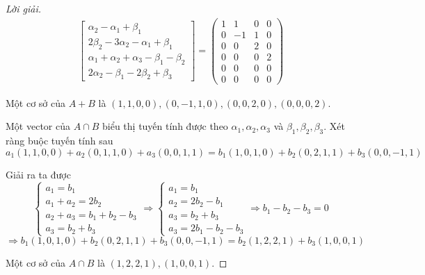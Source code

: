 \documentclass[class=linear-algebra,crop=false]{standalone}
\begin{document}
\begin{proof}[Lời giải]
\begin{align*}
\begin{bmatrix}
            \alpha_{2} - \alpha_{1} + \beta_{1}                          \\
            2\beta_{2} - 3\alpha_{2} - \alpha_{1} + \beta_{1}            \\
            \alpha_{1} + \alpha_{2} + \alpha_{3} - \beta_{1} - \beta_{2} \\
            2\alpha_{2} - \beta_{1} - 2\beta_{2} + \beta_{3}
        \end{bmatrix}=
        \begin{pmatrix}
            1 & 1  & 0 & 0 \\
            0 & -1 & 1 & 0 \\
            0 & 0  & 2 & 0 \\
            0 & 0  & 0 & 2 \\
            0 & 0  & 0 & 0 \\
            0 & 0  & 0 & 0
        \end{pmatrix}
    \end{align*}
    \par Một cơ sở của $A + B$ là $(1,1,0,0), (0,-1,1,0), (0,0,2,0), (0,0,0,2)$.
    \par Một vector của $A\cap B$ biểu thị tuyến tính được theo $\alpha_{1}, \alpha_{2}, \alpha_{3}$ và $\beta_{1}, \beta_{2}, \beta_{3}$. Xét ràng buộc tuyến tính sau
    \[ a_{1}(1,1,0,0) + a_{2}(0,1,1,0) + a_{3}(0,0,1,1) = b_{1}(1,0,1,0) + b_{2}(0,2,1,1) + b_{3}(0,0,-1,1) \]
    \par Giải ra ta được
    \[
        \begin{cases}
            a_{1} = b_{1}                         \\
            a_{1} + a_{2} = 2b_{2}                \\
            a_{2} + a_{3} = b_{1} + b_{2} - b_{3} \\
            a_{3} = b_{2} + b_{3}
        \end{cases}
        \Longrightarrow
        \begin{cases}
            a_{1} = b_{1}          \\
            a_{2} = 2b_{2} - b_{1} \\
            a_{3} = b_{2} + b_{3}  \\
            a_{3} = 2b_{1} - b_{2} - b_{3}
        \end{cases}
        \Longrightarrow
        b_{1} - b_{2} - b_{3} = 0
    \]
    \[
        \Rightarrow b_{1}(1,0,1,0) + b_{2}(0,2,1,1) + b_{3}(0,0,-1,1) = b_{2}(1,2,2,1) + b_{3}(1,0,0,1)
    \]
    \par Một cơ sở của $A\cap B$ là $(1,2,2,1), (1,0,0,1)$.
\end{proof}
\end{document}
